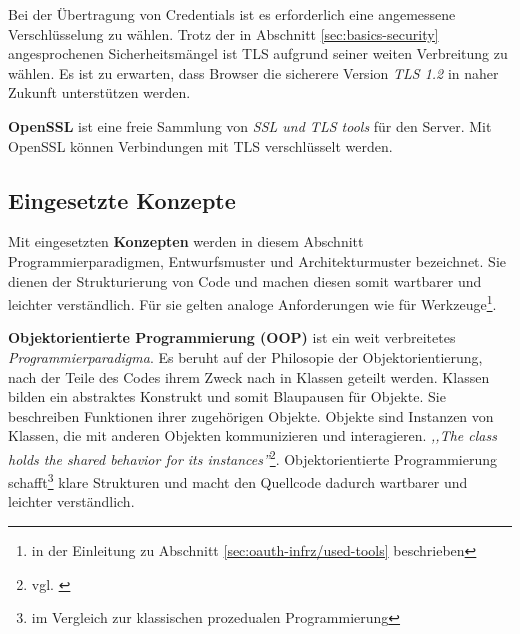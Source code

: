 \documentclass[12pt,a4paper,pointednumbers,abstracton]{scrartcl}
\begin{document}
Bei der Übertragung von Credentials ist es erforderlich eine angemessene Verschlüsselung zu wählen.
Trotz der in Abschnitt \ref{sec:basics-security} angesprochenen Sicherheitsmängel ist TLS aufgrund seiner weiten Verbreitung zu wählen.
Es ist zu erwarten, dass Browser die sicherere Version \emph{TLS 1.2} in naher Zukunft unterstützen werden.

\textbf{OpenSSL} ist eine freie Sammlung von \emph{SSL und TLS tools} für den Server.
Mit OpenSSL können Verbindungen mit TLS verschlüsselt werden.



\subsection{Eingesetzte Konzepte}
\label{sec:oauth-infrz/concepts}

Mit eingesetzten \textbf{Konzepten} werden in diesem Abschnitt Programmierparadigmen, Entwurfsmuster und Architekturmuster bezeichnet.
Sie dienen der Strukturierung von Code und machen diesen somit wartbarer und leichter verständlich.
Für sie gelten analoge Anforderungen wie für Werkzeuge\footnote{in der Einleitung zu Abschnitt \ref{sec:oauth-infrz/used-tools} beschrieben}.

\textbf{Objektorientierte Programmierung (OOP)} ist ein weit verbreitetes \emph{Programmierparadigma}.
Es beruht auf der Philosopie der Objektorientierung, nach der Teile des Codes ihrem Zweck nach in Klassen geteilt werden.
Klassen bilden ein abstraktes Konstrukt und somit Blaupausen für Objekte. Sie beschreiben Funktionen ihrer zugehörigen Objekte.
Objekte sind Instanzen von Klassen, die mit anderen Objekten kommunizieren und interagieren.
\emph{,,The class holds the shared behavior for its instances''}\footnote{vgl. \cite[Chapter IV.]{Kay93}}.
Objektorientierte Programmierung schafft\footnote{im Vergleich zur klassischen prozedualen Programmierung} klare Strukturen und macht den Quellcode dadurch wartbarer und leichter verständlich.
\end{document}
